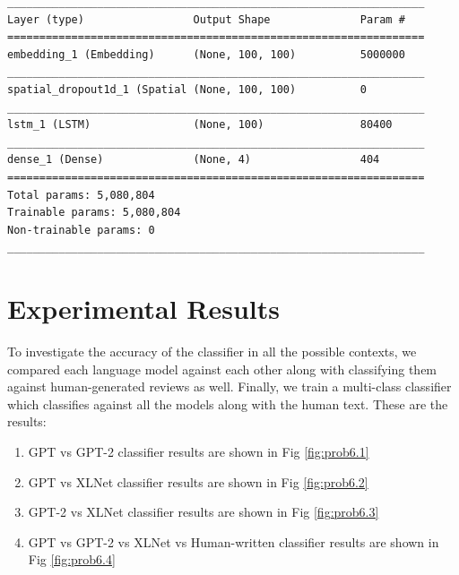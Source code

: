\documentclass[11pt,letterpaper]{article}
\begin{document}
\begin{verbatim}
_________________________________________________________________
Layer (type)                 Output Shape              Param #   
=================================================================
embedding_1 (Embedding)      (None, 100, 100)          5000000   
_________________________________________________________________
spatial_dropout1d_1 (Spatial (None, 100, 100)          0         
_________________________________________________________________
lstm_1 (LSTM)                (None, 100)               80400     
_________________________________________________________________
dense_1 (Dense)              (None, 4)                 404       
=================================================================
Total params: 5,080,804
Trainable params: 5,080,804
Non-trainable params: 0
_________________________________________________________________
\end{verbatim}

\section{Experimental Results}
To investigate the accuracy of the classifier in all the possible 
contexts, we compared each language model against each other along with 
classifying them against human-generated reviews as well. Finally, 
we train a multi-class classifier which classifies against all the 
models along with the human text. These are the results:
\begin{enumerate}
        \item GPT vs GPT-2 classifier results are shown in Fig \ref{fig:prob6.1}
        \item GPT vs XLNet classifier results are shown in Fig \ref{fig:prob6.2}
        \item GPT-2 vs XLNet classifier results are shown in Fig \ref{fig:prob6.3}
        \item GPT vs GPT-2 vs XLNet vs Human-written classifier results are shown in Fig \ref{fig:prob6.4}
\end{enumerate}
\end{document}
